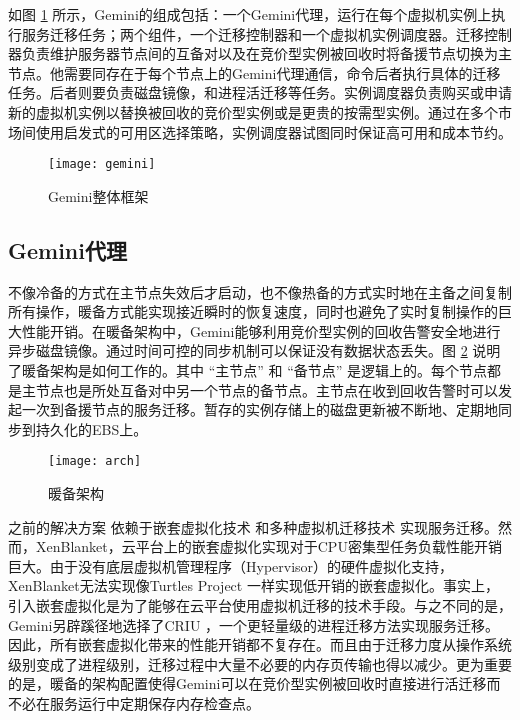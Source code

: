 如图 \ref{figure:gemini} 所示，Gemini的组成包括：一个Gemini代理，运行在每个虚拟机实例上执行服务迁移任务；两个组件，一个迁移控制器和一个虚拟机实例调度器。迁移控制器负责维护服务器节点间的互备对以及在竞价型实例被回收时将备援节点切换为主节点。他需要同存在于每个节点上的Gemini代理通信，命令后者执行具体的迁移任务。后者则要负责磁盘镜像，和进程活迁移等任务。实例调度器负责购买或申请新的虚拟机实例以替换被回收的竞价型实例或是更贵的按需型实例。通过在多个市场间使用启发式的可用区选择策略，实例调度器试图同时保证高可用和成本节约。
\begin{figure}
  \centering
  \texttt{[image: gemini]}
  \caption{Gemini整体框架}
  \label{figure:gemini}
\end{figure}

\subsection{Gemini代理}
不像冷备的方式在主节点失效后才启动，也不像热备的方式实时地在主备之间复制所有操作，暖备方式能实现接近瞬时的恢复速度，同时也避免了实时复制操作的巨大性能开销。在暖备架构中，Gemini能够利用竞价型实例的回收告警安全地进行异步磁盘镜像。通过时间可控的同步机制可以保证没有数据状态丢失。图 \ref{figure:arch} 说明了暖备架构是如何工作的。其中 ``主节点'' 和 ``备节点'' 是逻辑上的。每个节点都是主节点也是所处互备对中另一个节点的备节点。主节点在收到回收告警时可以发起一次到备援节点的服务迁移。暂存的实例存储上的磁盘更新被不断地、定期地同步到持久化的EBS上。
\begin{figure}
  \centering
  \texttt{[image: arch]}
  \caption{暖备架构}
  \label{figure:arch}
\end{figure}

之前的解决方案\cite{He:2015:CCH:2749246.2749275} 依赖于嵌套虚拟化技术 \cite{Williams:2012:XVO:2168836.2168849} 和多种虚拟机迁移技术 \cite{Singh:2013:YEG:2482626.2482642, Hines:2009:PBL:1508293.1508301} 实现服务迁移。然而，XenBlanket，云平台上的嵌套虚拟化实现对于CPU密集型任务负载性能开销巨大。由于没有底层虚拟机管理程序（Hypervisor）的硬件虚拟化支持，XenBlanket无法实现像Turtles Project \cite{Ben-Yehuda:2010:TPD:1924943.1924973} 一样实现低开销的嵌套虚拟化。事实上，引入嵌套虚拟化是为了能够在云平台使用虚拟机迁移的技术手段。与之不同的是，Gemini另辟蹊径地选择了CRIU \cite{CRIU:2016}，一个更轻量级的进程迁移方法实现服务迁移。因此，所有嵌套虚拟化带来的性能开销都不复存在。而且由于迁移力度从操作系统级别变成了进程级别，迁移过程中大量不必要的内存页传输也得以减少。更为重要的是，暖备的架构配置使得Gemini可以在竞价型实例被回收时直接进行活迁移而不必在服务运行中定期保存内存检查点。

